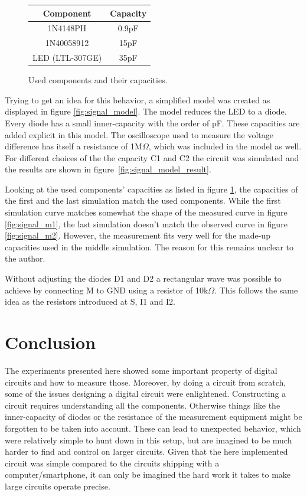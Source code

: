 \documentclass[journal]{IEEEtran}
\begin{document}
\begin{figure}
	\centering
	\begin{tabular}{c | c}
		  Component & Capacity \\ \hline
		  1N4148PH   & 0.9pF \\
		  1N40058912 & 15pF  \\
		  LED (LTL-307GE)  & 35pF\\
	\end{tabular}
	\caption{Used components and their capacities.}
	\label{fig:signal_capacity_real} 
\end{figure}

Trying to get an idea for this behavior, a simplified model was created as
displayed in figure \ref{fig:signal_model}. The model reduces the LED to a diode. Every
diode has a small inner-capacity with the order of pF. These capacities are
added explicit in this model. The oscilloscope used to measure the voltage difference
has itself a resistance of 1M$\Omega$, which was included in the model as well.
For different choices of the the capacity C1 and C2 the circuit was simulated
and the results are shown in figure~\ref{fig:signal_model_result}.

Looking at the used components' capacities as listed in figure
\ref{fig:signal_capacity_real}, the capacities of the first and the last
simulation match the used components. While the first simulation curve matches
somewhat the shape of the measured curve in figure \ref{fig:signal_m1}, the last
simulation doesn't match the observed curve in figure \ref{fig:signal_m2}.
However, the measurement fits very well for the made-up capacities used in the
middle simulation. The reason for this remains unclear to the author.

Without adjusting the diodes D1 and D2 a rectangular wave was possible to
achieve by connecting M to GND using a resistor of 10k$\Omega$. This follows
the same idea as the resistors introduced at S, I1 and I2.

\section{Conclusion}

The experiments presented here showed some important property of digital
circuits and how to measure those. Moreover, by doing a circuit from scratch, some of
the issues designing a digital circuit were enlightened. Constructing a circuit
requires understanding all the components. Otherwise things like the
inner-capacity of diodes or the resistance of the measurement equipment might be
forgotten to be taken into account. These can lead to unexpected behavior, which
were relatively simple to hunt down in this setup, but are imagined to be
much harder to find and control on larger circuits. Given that the here
implemented circuit was simple compared to the circuits shipping with a computer/smartphone, it can only be imagined the hard work it takes to make
large circuits operate precise. 
\end{document}
